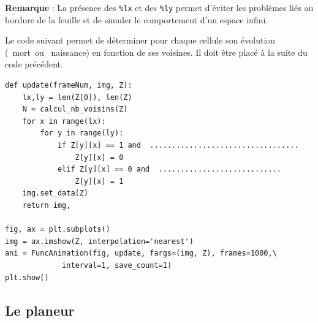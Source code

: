 
\textbf{Remarque} : La présence des \verb?%lx? et des \verb?%ly? permet d'éviter les problèmes liés au bordure de la feuille et de simuler le comportement d'un espace infini.

Le code suivant permet de déterminer pour chaque cellule son évolution (\og\ mort\fg\ ou \og\ naissance\fg) en fonction de ses voisines. Il doit être placé à la suite du code précédent.

\begin{verbatim}
def update(frameNum, img, Z):
    lx,ly = len(Z[0]), len(Z)
    N = calcul_nb_voisins(Z)
    for x in range(lx):
        for y in range(ly):
            if Z[y][x] == 1 and  ..................................
                Z[y][x] = 0
            elif Z[y][x] == 0 and  ............................
                Z[y][x] = 1
    img.set_data(Z)
    return img,

fig, ax = plt.subplots()
img = ax.imshow(Z, interpolation='nearest')
ani = FuncAnimation(fig, update, fargs=(img, Z), frames=1000,\
			 interval=1, save_count=1)
plt.show()
\end{verbatim}


\newpage

\subsection{Le planeur}

